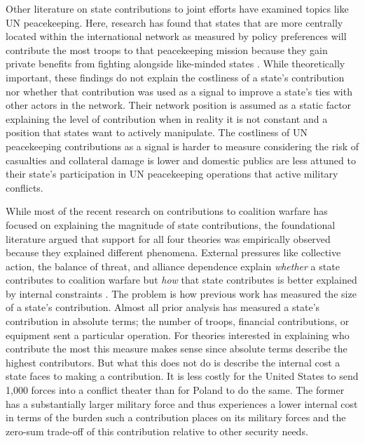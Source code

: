 \documentclass[12pt,letterpaper]{article}
\begin{document}
	Other literature on state contributions to joint efforts have examined topics like UN peacekeeping. Here, research has found that states that are more centrally located within the international network as measured by policy preferences will contribute the most troops to that peacekeeping mission because they gain private benefits from fighting alongside like-minded states \citep{dorussen_networkedinternationalpolitics_2016}. While theoretically important, these findings do not explain the costliness of a state's contribution nor whether that contribution was used as a signal to improve a state's ties with other actors in the network. Their network position is assumed as a static factor explaining the level of contribution when in reality it is not constant and a position that states want to actively manipulate. The costliness of UN peacekeeping contributions as a signal is harder to measure considering the risk of casualties and collateral damage is lower and domestic publics are less attuned to their state's participation in UN peacekeeping operations that active military conflicts.
	
	While most of the recent research on contributions to coalition warfare has focused on explaining the magnitude of state contributions, the foundational literature argued that support for all four theories was empirically observed because they explained different phenomena. External pressures like collective action, the balance of threat, and alliance dependence explain \textit{whether} a state contributes to coalition warfare but \textit{how} that state contributes is better explained by internal constraints \citep{bennett_burdensharingpersiangulf_1994}. The problem is how previous work has measured the size of a state's contribution. Almost all prior analysis has measured a state's contribution in absolute terms; the number of troops, financial contributions, or equipment sent a particular operation. For theories interested in explaining who contribute the most this measure makes sense since absolute terms describe the highest contributors. But what this does not do is describe the internal cost a state faces to making a contribution. It is less costly for the United States to send 1,000 forces into a conflict theater than for Poland to do the same. The former has a substantially larger military force and thus experiences a lower internal cost in terms of the burden such a contribution places on its military forces and the zero-sum trade-off of this contribution relative to other security needs.	
\end{document}
